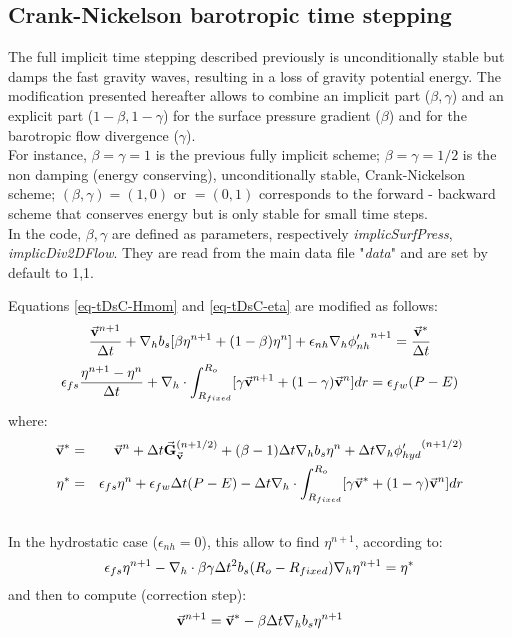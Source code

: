 \newpage
\subsection{Crank-Nickelson barotropic time stepping}

The full implicit time stepping described previously is unconditionally stable
but damps the fast gravity waves, resulting in a loss of 
gravity potential energy.
The modification presented hereafter allows to combine an implicit part
($\beta,\gamma$) and an explicit part ($1-\beta,1-\gamma$) for the surface
pressure gradient ($\beta$) and for the barotropic flow divergence ($\gamma$).
\\
For instance, $\beta=\gamma=1$ is the previous fully implicit scheme;
$\beta=\gamma=1/2$ is the non damping (energy conserving), unconditionally
stable, Crank-Nickelson scheme; $(\beta,\gamma)=(1,0)$ or $=(0,1)$
corresponds to the forward - backward scheme that conserves energy but is
only stable for small time steps.\\
In the code, $\beta,\gamma$ are defined as parameters, respectively 
{\it implicSurfPress}, {\it implicDiv2DFlow}. They are read from
the main data file "{\it data}" and are set by default to 1,1.

Equations \ref{eq-tDsC-Hmom} and \ref{eq-tDsC-eta} are modified as follows:
$$
\frac{ \vec{\bf v}^{n+1} }{ \Delta t }
+ {\bf \nabla}_h b_s [ \beta {\eta}^{n+1} + (1-\beta) {\eta}^{n} ] 
+ \epsilon_{nh} {\bf \nabla}_h {\phi'_{nh}}^{n+1}
 = \frac{ \vec{\bf v}^* }{ \Delta t }
$$
$$
\epsilon_{fs} \frac{ {\eta}^{n+1} - {\eta}^{n} }{ \Delta t}
+ {\bf \nabla}_h \cdot \int_{R_{fixed}}^{R_o} 
[ \gamma \vec{\bf v}^{n+1} + (1-\gamma) \vec{\bf v}^{n}] dr
= \epsilon_{fw} (P-E)
$$
where:
\begin{eqnarray*}
\vec{\bf v}^* & = &
\vec{\bf v} ^{n} + \Delta t \vec{\bf G}_{\vec{\bf v}} ^{(n+1/2)}
+ (\beta-1) \Delta t {\bf \nabla}_h b_s {\eta}^{n}
+ \Delta t {\bf \nabla}_h {\phi'_{hyd}}^{(n+1/2)}
\\
{\eta}^* & = &
\epsilon_{fs} {\eta}^{n} + \epsilon_{fw} \Delta t (P-E) 
- \Delta t {\bf \nabla}_h \cdot \int_{R_{fixed}}^{R_o} 
[ \gamma \vec{\bf v}^* + (1-\gamma) \vec{\bf v}^{n}] dr
\end{eqnarray*}
\\
In the hydrostatic case ($\epsilon_{nh}=0$),
this allow to find ${\eta}^{n+1}$, according to:
$$
\epsilon_{fs} {\eta}^{n+1} -
{\bf \nabla}_h \cdot \beta\gamma \Delta t^2 b_s (R_o - R_{fixed})
{\bf \nabla}_h {\eta}^{n+1}
= {\eta}^*
$$ 
and then to compute (correction step):
$$
\vec{\bf v}^{n+1} = \vec{\bf v}^{*}
- \beta \Delta t {\bf \nabla}_h b_s {\eta}^{n+1}
$$

